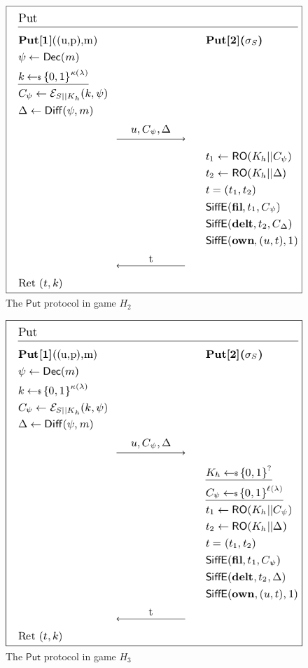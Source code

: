 \begin{figure}[H]
	\centering
	\includegraphics[scale=0.35]{H2}
	\caption{The $\mathsf{Put}$ protocol in game $H_2$}
\end{figure}

\begin{figure}[H]
	\centering
	\includegraphics[scale=0.35]{H3}
	\caption{The $\mathsf{Put}$ protocol in game $H_3$}
\end{figure}

